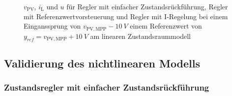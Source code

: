\begin{figure}[H]
    \centering
    \caption[Reglervergleich für das lineare Zustandsraummodell]{$v_{\mathrm{PV}}$, $i_{\mathrm{L}}$ und $u$ für Regler mit einfacher Zustandsrückführung, Regler mit Referenzwertvorsteuerung und Regler mit I-Regelung bei einem Einganssprung von $v_{\mathrm{PV,MPP}} - \SI{10}{V}$ \bzw einem Referenzwert von $y_{ref} = v_{\mathrm{PV,MPP}} + \SI{10}{V}$ am linearen Zustandsraummodell}
    \label{fig:Bild19}
\end{figure}

\subsection{Validierung des nichtlinearen Modells} \label{sec:Vergleich_nichtlinear}

\subsubsection{Zustandsregler mit einfacher Zustandsrückführung}

